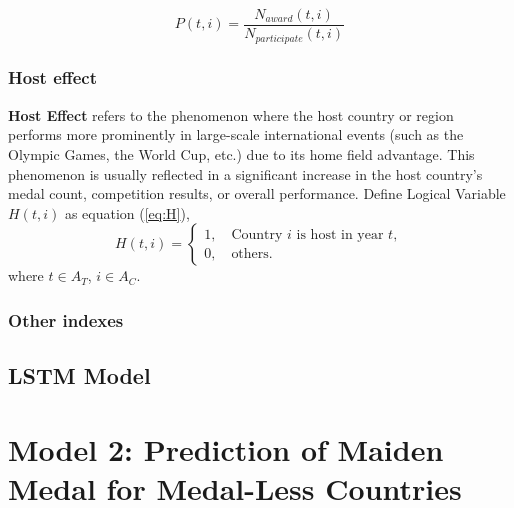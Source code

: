 \documentclass{mcmthesis}
\begin{document}

\begin{equation*}
P(t,i)=\frac{ N_{award}(t,i) }{ N_{participate}(t,i) }
\end{equation*}


\subsubsection{Host effect}

\textbf{Host Effect} refers to the phenomenon where the host country or region performs more prominently in large-scale international events (such as the Olympic Games, the World Cup, etc.) due to its home field advantage. This phenomenon is usually reflected in a significant increase in the host country's medal count, competition results, or overall performance. Define Logical Variable $H(t,i)$ as equation (\ref{eq:H}),
\begin{equation}
H(t,i)=
\begin{cases}
1, \quad \text{Country } i \text{ is host in year } t, \\
0, \quad \text{others}.
\end{cases}
\label{eq:H}
\end{equation}
where $t\in A_{T}$, $i\in A_{C}$.



\subsubsection{Other indexes}




\subsection{LSTM Model}







\section{Model 2: Prediction of Maiden Medal for Medal-Less Countries}
\end{document}
